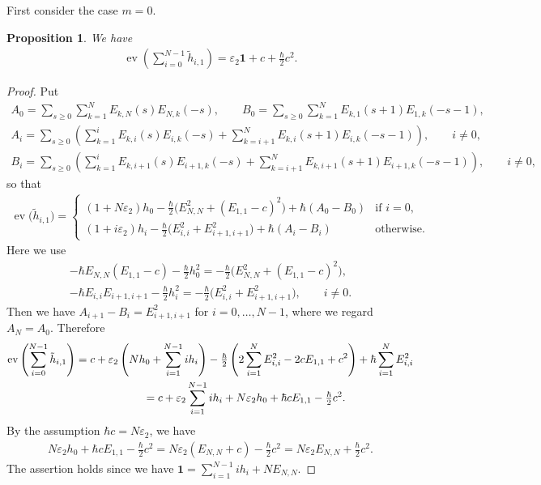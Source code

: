 \documentclass[11pt]{article}
\newtheorem{prop}[thm]{Proposition}
\theoremstyle{definition}
\numberwithin{equation}{section}
\DeclareMathOperator{\ev}{ev}
\newcommand{\ve}{\varepsilon}
\newcommand{\bfid}{\mathbf{1}}
\begin{document}
First consider the case $m=0$.
\begin{prop}\label{prop:zero-mode} We have
\begin{gather*} \ev \left( \sum_{i=0}^{N-1} \tilde{h}_{i,1} \right)= \ve_2 \bfid + c + \tfrac{\hbar}{2} c^2.
\end{gather*}
\end{prop}
\begin{proof}
Put
\begin{gather*}
A_0 = \sum_{s \geq 0} \sum_{k=1}^N E_{k,N}(s)E_{N,k}(-s),\qquad
B_0 = \sum_{s \geq 0} \sum_{k=1}^N E_{k,1}(s+1)E_{1,k}(-s-1),\\
A_i = \sum_{s \geq 0} \left( \sum_{k=1}^i E_{k,i}(s)E_{i,k}(-s) + \sum_{k=i+1}^N E_{k,i}(s+1)E_{i,k}(-s-1) \right), \qquad i \neq 0,\\
B_i = \sum_{s \geq 0} \left( \sum_{k=1}^i E_{k,i+1}(s)E_{i+1,k}(-s) + \sum_{k=i+1}^N E_{k,i+1}(s+1)E_{i+1,k}(-s-1) \right), \qquad i \neq 0,
\end{gather*}
so that
\begin{gather*}
\ev\big(\tilde{h}_{i,1}\big) = \begin{cases}
(1+ N \varepsilon_2) h_{0} - \tfrac{\hbar}{2} \big(E_{N,N}^2 + (E_{1,1}-c)^2\big) + \hbar(A_0-B_0)& \text{if $i=0$},\\
(1+ i \varepsilon_2) h_{i} - \tfrac{\hbar}{2} \big(E_{i,i}^2 + E_{i+1,i+1}^2\big) + \hbar(A_i-B_i)& \text{otherwise}.
\end{cases}
\end{gather*}
Here we use
\begin{gather*}
-\hbar E_{N,N}(E_{1,1}-c) - \tfrac{\hbar}{2} h_0^2 = - \tfrac{\hbar}{2} \big(E_{N,N}^2 + (E_{1,1}-c)^2\big),\\
-\hbar E_{i,i} E_{i+1,i+1} - \tfrac{\hbar}{2} h_i^2 = - \tfrac{\hbar}{2} \big(E_{i,i}^2 + E_{i+1,i+1}^2\big), \qquad i \neq 0.
\end{gather*}
Then we have $A_{i+1}-B_{i}=E_{i+1,i+1}^2$ for $i=0,\ldots,N-1$, where we regard $A_N=A_0$.
Therefore
\begin{gather*}
\ev \left( \sum_{i=0}^{N-1} \tilde{h}_{i,1} \right)= c + \ve_2 \left(N h_0 + \sum_{i=1}^{N-1} i h_i\right) -\tfrac{\hbar}{2}\left( 2\sum_{i=1}^N E_{i,i}^2 - 2cE_{1,1} + c^2\right) + \hbar \sum_{i=1}^N E_{i,i}^2 \\
\hphantom{\ev \left( \sum_{i=0}^{N-1} \tilde{h}_{i,1} \right)}{} = c + \ve_2 \sum_{i=1}^{N-1} i h_i + N \ve_2 h_0 + \hbar c E_{1,1} - \tfrac{\hbar}{2}c^2.
\end{gather*}
By the assumption $\hbar c = N\ve_2$, we have
\begin{gather*}
N \ve_2 h_0 + \hbar c E_{1,1} - \tfrac{\hbar}{2}c^2 = N \ve_2 (E_{N,N} + c) - \tfrac{\hbar}{2}c^2 = N \ve_2 E_{N,N} + \tfrac{\hbar}{2}c^2.
\end{gather*}
The assertion holds since we have $\bfid = \sum\limits_{i=1}^{N-1} i h_i + NE_{N,N}$.
\end{proof}
\end{document}
